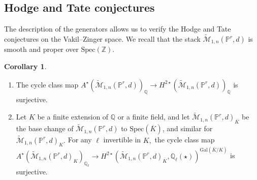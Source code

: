 \documentclass[12pt,reqno]{amsart}
\theoremstyle{definition}
\theoremstyle{definition}
\theoremstyle{definition}
\theoremstyle{definition}
\newtheorem{corollary}[theorem]{Corollary}
\newcommand{\PP}{\mathbb{P}}
\newcommand{\Mtil}{\widetilde{\mathcal{M}}}
\begin{document}
\subsection{Hodge and Tate conjectures}
The description of the generators allows us to verify the Hodge and Tate conjectures on the Vakil--Zinger space. We recall that the stack $\Mtil_{1,n}(\PP^r,d)$ is smooth and proper over $\mathrm{Spec}(\mathbb{Z}).$
\begin{corollary}\label{cor:HT}
  \begin{enumerate}
    \item The cycle class map $A^\star(\Mtil_{1,n}(\PP^r,d))_{\mathbb{Q}}\to H^{2\star}(\Mtil_{1,n}(\PP^r,d))_{\mathbb{Q}}$ is surjective.
    \item Let $K$ be a finite extension of $\mathbb{Q}$ or a finite field, and let $\Mtil_{1,n}(\PP^r,d)_{\overline{K}}$ be the base change of $\Mtil_{1,n}(\PP^r,d)$ to $\mathrm{Spec}(\overline{K})$, and similar for $\Mtil_{1,n}(\PP^r,d)_{{K}}.$ For any $\ell$ invertible in $K,$ the cycle class map $A^\star(\Mtil_{1,n}(\PP^r,d)_{{K}})_{\mathbb{Q}_{\ell}}\to H^{2\star}(\Mtil_{1,n}(\PP^r,d)_{\overline{K}}, \mathbb{Q}_\ell(\star))^{\mathrm{Gal}(\overline{K}/K)}$ is surjective.
  \end{enumerate}
\end{corollary}
\end{document}
